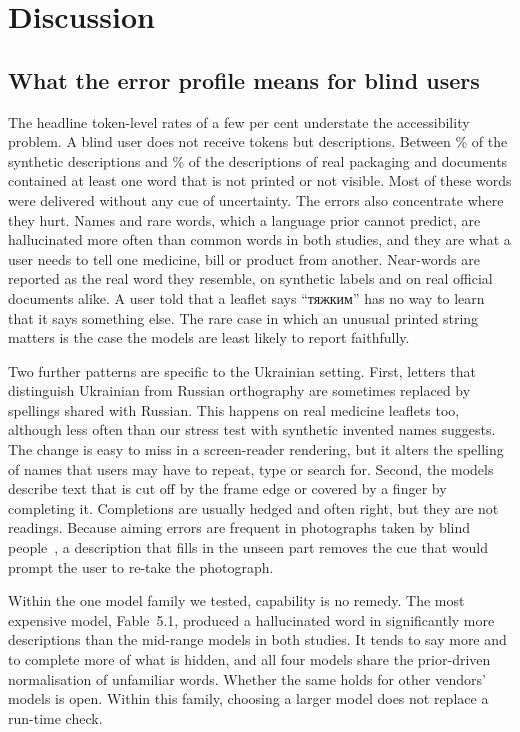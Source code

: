 \section{Discussion}\label{sec:discussion}

\subsection{What the error profile means for blind users}

The headline token-level rates of a few per cent understate the accessibility problem. A blind user does not receive tokens but descriptions. Between \RangeImg\% of the synthetic descriptions and \RealRangeImg\% of the descriptions of real packaging and documents contained at least one word that is not printed or not visible. Most of these words were delivered without any cue of uncertainty. The errors also concentrate where they hurt. Names and rare words, which a language prior cannot predict, are hallucinated more often than common words in both studies, and they are what a user needs to tell one medicine, bill or product from another. Near-words are reported as the real word they resemble, on synthetic labels and on real official documents alike. A user told that a leaflet says ``\foreignlanguage{ukrainian}{тяжким}'' has no way to learn that it says something else. The rare case in which an unusual printed string matters is the case the models are least likely to report faithfully.

Two further patterns are specific to the Ukrainian setting. First, letters that distinguish Ukrainian from Russian orthography are sometimes replaced by spellings shared with Russian. This happens on real medicine leaflets too, although less often than our stress test with synthetic invented names suggests. The change is easy to miss in a screen-reader rendering, but it alters the spelling of names that users may have to repeat, type or search for. Second, the models describe text that is cut off by the frame edge or covered by a finger by completing it. Completions are usually hedged and often right, but they are not readings. Because aiming errors are frequent in photographs taken by blind people~\cite{gurari2018vizwiz}, a description that fills in the unseen part removes the cue that would prompt the user to re-take the photograph.

Within the one model family we tested, capability is no remedy. The most expensive model, Fable~5.1, produced a hallucinated word in significantly more descriptions than the mid-range models in both studies. It tends to say more and to complete more of what is hidden, and all four models share the prior-driven normalisation of unfamiliar words. Whether the same holds for other vendors' models is open. Within this family, choosing a larger model does not replace a run-time check.

